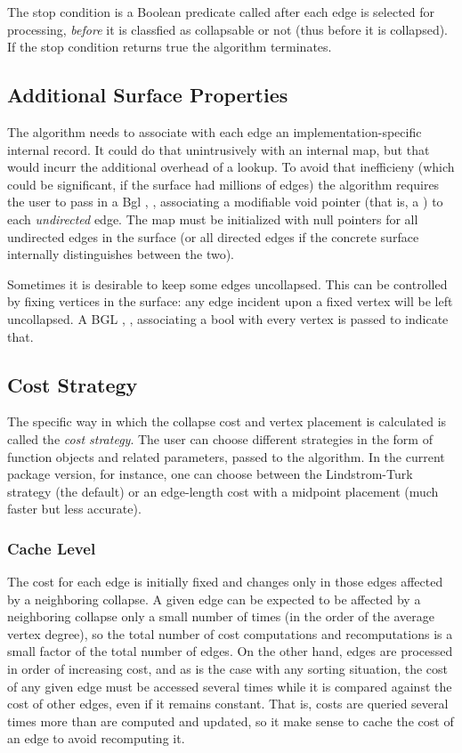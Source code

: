 The stop condition is a Boolean predicate called after each edge is selected for processing, {\em before} it is classfied as collapsable or not (thus before it is collapsed). If the stop condition returns true the algorithm terminates.

\subsection{Additional Surface Properties}

The algorithm needs to associate with each edge an implementation-specific internal record. It could do that unintrusively with an internal map, but that would incurr the additional overhead of a lookup. To avoid that inefficieny (which could be significant, if the surface had millions of edges) the algorithm requires the user to pass in a {\sc Bgl} , , associating a modifiable void pointer (that is, a ) to each {\em undirected} edge. The map must be initialized with null pointers for all undirected edges in the surface (or all directed edges if the concrete surface internally distinguishes between the two). 

Sometimes it is desirable to keep some edges uncollapsed. This can be controlled by fixing vertices in the surface: any edge incident upon a fixed vertex will be left uncollapsed. A {\sc BGL} , , associating a bool with every vertex is passed to indicate that.

\subsection{Cost Strategy}

The specific way in which the collapse cost and vertex placement is calculated is called the {\em cost strategy}.
The user can choose different strategies in the form of function objects and related parameters, passed to the algorithm.
In the current package version, for instance, one can choose between the Lindstrom-Turk strategy (the default) or an edge-length cost with a midpoint placement (much faster but less accurate).

\subsubsection{Cache Level}

The cost for each edge is initially fixed and changes only in those edges affected by a neighboring collapse. A given edge can be expected to be affected by a neighboring collapse only a small number of times (in the order of the average vertex degree), so the total number of cost computations and recomputations is a small factor of the total number of edges. On the other hand, edges are processed in order of increasing cost, and as is the case with any sorting situation, the cost of any given edge must be accessed several times while it is compared against the cost of other edges, even if it remains constant. That is, costs are queried several times more than are computed and updated, so it make sense to cache the cost of an edge to avoid recomputing it.

